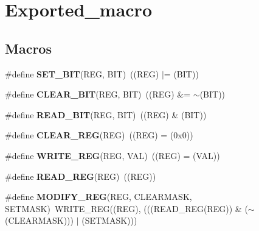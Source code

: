 \hypertarget{group___exported__macro}{\section{Exported\-\_\-macro}
\label{group___exported__macro}
}
\subsection*{Macros}
\begin{DoxyCompactItemize}
\item 
\hypertarget{group___exported__macro_ga26474f43799fbade9cf300e21dd3a91a}{\#define {\bfseries S\-E\-T\-\_\-\-B\-I\-T}(R\-E\-G, B\-I\-T)~((R\-E\-G) $\vert$= (B\-I\-T))}\label{group___exported__macro_ga26474f43799fbade9cf300e21dd3a91a}

\item 
\hypertarget{group___exported__macro_ga133aae6fc0d41bffab39ab223a7001de}{\#define {\bfseries C\-L\-E\-A\-R\-\_\-\-B\-I\-T}(R\-E\-G, B\-I\-T)~((R\-E\-G) \&= $\sim$(B\-I\-T))}\label{group___exported__macro_ga133aae6fc0d41bffab39ab223a7001de}

\item 
\hypertarget{group___exported__macro_ga822bb1bb9710d5f2fa6396b84e583c33}{\#define {\bfseries R\-E\-A\-D\-\_\-\-B\-I\-T}(R\-E\-G, B\-I\-T)~((R\-E\-G) \& (B\-I\-T))}\label{group___exported__macro_ga822bb1bb9710d5f2fa6396b84e583c33}

\item 
\hypertarget{group___exported__macro_ga1378fbdda39f40b85420df55f41460ef}{\#define {\bfseries C\-L\-E\-A\-R\-\_\-\-R\-E\-G}(R\-E\-G)~((R\-E\-G) = (0x0))}\label{group___exported__macro_ga1378fbdda39f40b85420df55f41460ef}

\item 
\hypertarget{group___exported__macro_ga32f78bffcaf6d13023dcd7f05e0c4d57}{\#define {\bfseries W\-R\-I\-T\-E\-\_\-\-R\-E\-G}(R\-E\-G, V\-A\-L)~((R\-E\-G) = (V\-A\-L))}\label{group___exported__macro_ga32f78bffcaf6d13023dcd7f05e0c4d57}

\item 
\hypertarget{group___exported__macro_gae7f188a4d26c9e713a48414783421071}{\#define {\bfseries R\-E\-A\-D\-\_\-\-R\-E\-G}(R\-E\-G)~((R\-E\-G))}\label{group___exported__macro_gae7f188a4d26c9e713a48414783421071}

\item 
\hypertarget{group___exported__macro_ga6553c99f510c3bab8cc0a91602053247}{\#define {\bfseries M\-O\-D\-I\-F\-Y\-\_\-\-R\-E\-G}(R\-E\-G, C\-L\-E\-A\-R\-M\-A\-S\-K, S\-E\-T\-M\-A\-S\-K)~W\-R\-I\-T\-E\-\_\-\-R\-E\-G((R\-E\-G), (((R\-E\-A\-D\-\_\-\-R\-E\-G(R\-E\-G)) \& ($\sim$(C\-L\-E\-A\-R\-M\-A\-S\-K))) $\vert$ (S\-E\-T\-M\-A\-S\-K)))}\label{group___exported__macro_ga6553c99f510c3bab8cc0a91602053247}


\end{DoxyCompactItemize}
